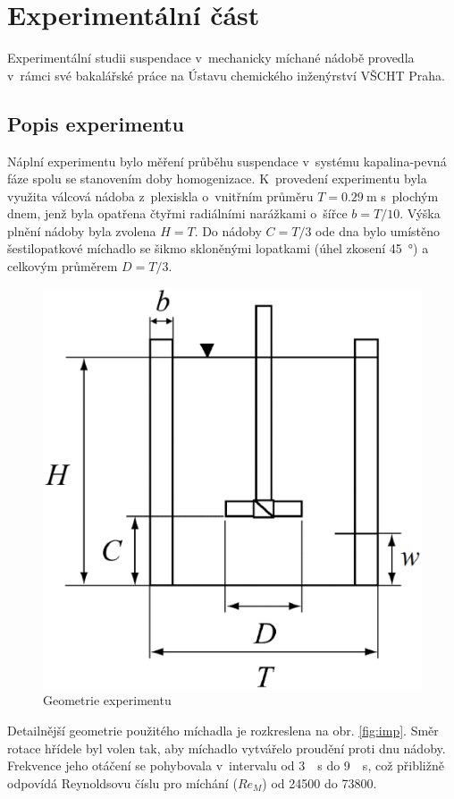 \chapter{Experimentální část}
Experimentální studii suspendace v~mechanicky míchané nádobě provedla \citet{pav11} v~rámci své bakalářské práce na Ústavu chemického inženýrství VŠCHT Praha.

\section{Popis experimentu}
\label{chap:exp}
Náplní experimentu bylo měření průběhu suspendace v~systému kapalina-pevná fáze spolu se stanovením doby homogenizace. K~provedení experimentu byla využita válcová nádoba z~plexiskla o~vnitřním průměru $T=\SI{0.29}{\meter}$ s~plochým dnem, jenž byla opatřena čtyřmi radiálními narážkami o~šířce $b=T/10$. Výška plnění nádoby byla zvolena $H=T$. Do nádoby $C=T/3$ ode dna bylo umístěno šestilopatkové míchadlo se šikmo skloněnými lopatkami (úhel zkosení \SI{45}{\degree}) a celkovým průměrem  $D=T/3$. 
\begin{figure}[h!]
\centering
\includegraphics[scale=0.44]{images/mujedit.eps}
\caption{Geometrie experimentu}
\label{fig:nadoba}
\end{figure} 
Detailnější geometrie použitého míchadla je rozkreslena na obr. \ref{fig:imp}. Směr rotace hřídele byl volen tak, aby míchadlo vytvářelo proudění proti dnu nádoby. Frekvence jeho otáčení se pohybovala v~intervalu od \SI{3}{\per\second} do \SI{9}{\per\second}, což přibližně odpovídá Reynoldsovu číslu pro míchání ($Re_{M}$) od \num{24500} do \num{73800}.

